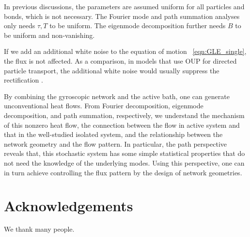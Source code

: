 \documentclass[
 preprint,
 preprintnumbers,
 amsmath,amssymb,
 aps,
 pre,
 longbibliography,
 10pt, twocolumn
]{revtex4-1}
\begin{document}
In previous discussions, the parameters are assumed uniform for all particles and bonds, which is not necessary.
The Fourier mode and path summation analyses only needs $\tau,T$ to be uniform. The eigenmode decomposition further needs $B$ to be uniform and non-vanishing.

If we add an additional white noise to the equation of motion \eqnname~\eqref{eqn:GLE_single}, the flux is not affected. As a comparison, in models that use OUP for directed particle transport, the additional white noise would usually suppress the rectification \cite{Bartussek1996PreciseRatchets}.

By combining the gyroscopic network and the active bath, one can generate unconventional heat flows. 
From Fourier decomposition, eigenmode decomposition, and path summation, respectively, we understand the mechanism of this nonzero heat flow, the connection between the flow in active system and that in the well-studied isolated system, and the relationship between the network geometry and the flow pattern.
In particular, the path perspective reveals that, this stochastic system has some simple statistical properties that do not need the knowledge of the underlying modes. Using this perspective, one can in turn achieve controlling the flux pattern by the design of network geometries.


\section*{Acknowledgements}
We thank many people.



\end{document}

